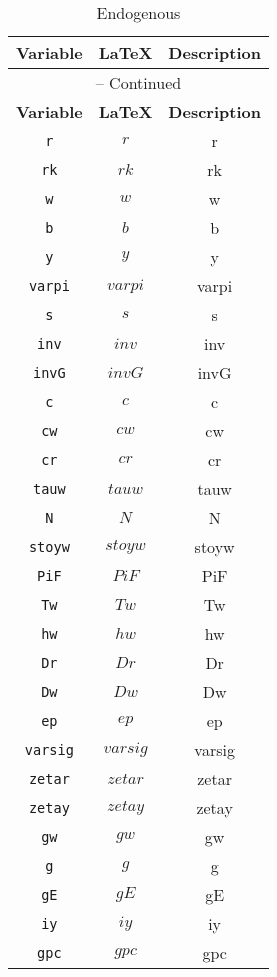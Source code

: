 \begin{center}
\begin{longtable}{ccc}
\caption{Endogenous}\\%
\hline%
\multicolumn{1}{c}{\textbf{Variable}} &
\multicolumn{1}{c}{\textbf{\LaTeX}} &
\multicolumn{1}{c}{\textbf{Description}}\\%
\hline\hline%
\endfirsthead
\multicolumn{3}{c}{{\tablename} \thetable{} -- Continued}\\%
\hline%
\multicolumn{1}{c}{\textbf{Variable}} &
\multicolumn{1}{c}{\textbf{\LaTeX}} &
\multicolumn{1}{c}{\textbf{Description}}\\%
\hline\hline%
\endhead
\texttt{r} & $r$ & r\\
\texttt{rk} & $rk$ & rk\\
\texttt{w} & $w$ & w\\
\texttt{b} & $b$ & b\\
\texttt{y} & $y$ & y\\
\texttt{varpi} & $varpi$ & varpi\\
\texttt{s} & $s$ & s\\
\texttt{inv} & $inv$ & inv\\
\texttt{invG} & $invG$ & invG\\
\texttt{c} & $c$ & c\\
\texttt{cw} & $cw$ & cw\\
\texttt{cr} & $cr$ & cr\\
\texttt{tauw} & $tauw$ & tauw\\
\texttt{N} & $N$ & N\\
\texttt{stoyw} & $stoyw$ & stoyw\\
\texttt{PiF} & $PiF$ & PiF\\
\texttt{Tw} & $Tw$ & Tw\\
\texttt{hw} & $hw$ & hw\\
\texttt{Dr} & $Dr$ & Dr\\
\texttt{Dw} & $Dw$ & Dw\\
\texttt{ep} & $ep$ & ep\\
\texttt{varsig} & $varsig$ & varsig\\
\texttt{zetar} & $zetar$ & zetar\\
\texttt{zetay} & $zetay$ & zetay\\
\texttt{gw} & $gw$ & gw\\
\texttt{g} & $g$ & g\\
\texttt{gE} & $gE$ & gE\\
\texttt{iy} & $iy$ & iy\\
\texttt{gpc} & $gpc$ & gpc\\

\end{longtable}
\end{center}
